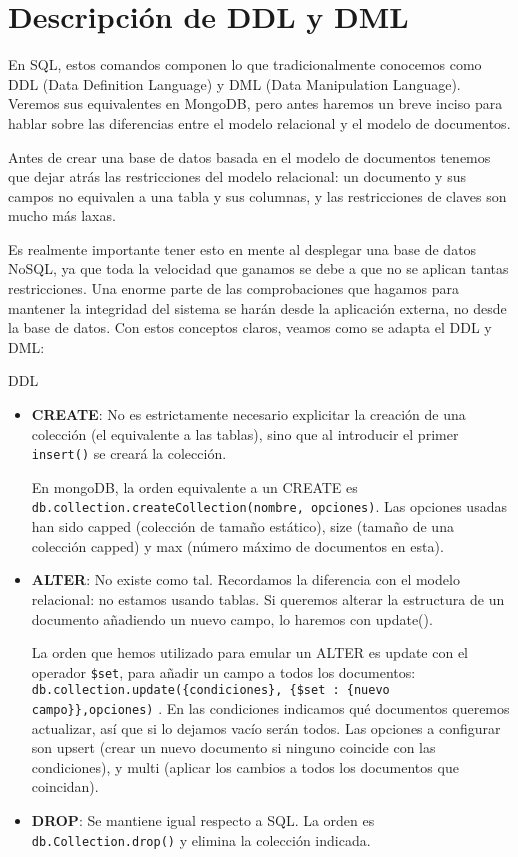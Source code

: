 \chapter{Descripción de DDL y DML}
En SQL, estos comandos componen lo que tradicionalmente conocemos como DDL (Data Definition Language) y DML (Data Manipulation Language). Veremos sus equivalentes en MongoDB, pero antes haremos un breve inciso para hablar sobre las diferencias entre el modelo relacional y el modelo de documentos.

Antes de crear una base de datos basada en el modelo de documentos tenemos que dejar atrás las restricciones del modelo relacional: un documento y sus campos no equivalen a una tabla y sus columnas, y las restricciones de claves son mucho más laxas.

Es realmente importante tener esto en mente al desplegar una base de datos NoSQL, ya que toda la velocidad que ganamos se debe a que no se aplican tantas restricciones. Una enorme parte de las comprobaciones que hagamos para mantener la integridad del sistema se harán desde la aplicación externa, no desde la base de datos. Con estos conceptos claros, veamos como se adapta el DDL y DML:

\bigskip

{\LARGE DDL}

  \begin{itemize}
    \item \textbf{CREATE}: No es estrictamente necesario explicitar la creación de una colección (el equivalente a las tablas), sino que al introducir el primer \texttt{insert()} se creará la colección.

    En mongoDB, la orden equivalente a un CREATE es \texttt{db.collection.createCollection(nombre, opciones)}. Las opciones usadas han sido capped (colección de tamaño estático), size (tamaño de una colección capped) y max (número máximo de documentos en esta).

    \item \textbf{ALTER}: No existe como tal. Recordamos la diferencia con el modelo relacional: no estamos usando tablas. Si queremos alterar la estructura de un documento añadiendo un nuevo campo, lo haremos con update().

    La orden que hemos utilizado para emular un ALTER es update con el operador \texttt{\$set}, para añadir un campo a todos los documentos: \texttt{db.collection.update(\{condiciones\}, \{\$set : \{nuevo campo\}\},opciones)} . En las condiciones indicamos qué documentos queremos actualizar, así que si lo dejamos vacío serán todos. Las opciones a configurar son upsert (crear un nuevo documento si ninguno coincide con las condiciones), y multi (aplicar los cambios a todos los documentos que coincidan).

    \item \textbf{DROP}: Se mantiene igual respecto a SQL. La orden es \texttt{db.Collection.drop()} y elimina la colección indicada.

  \end{itemize}

